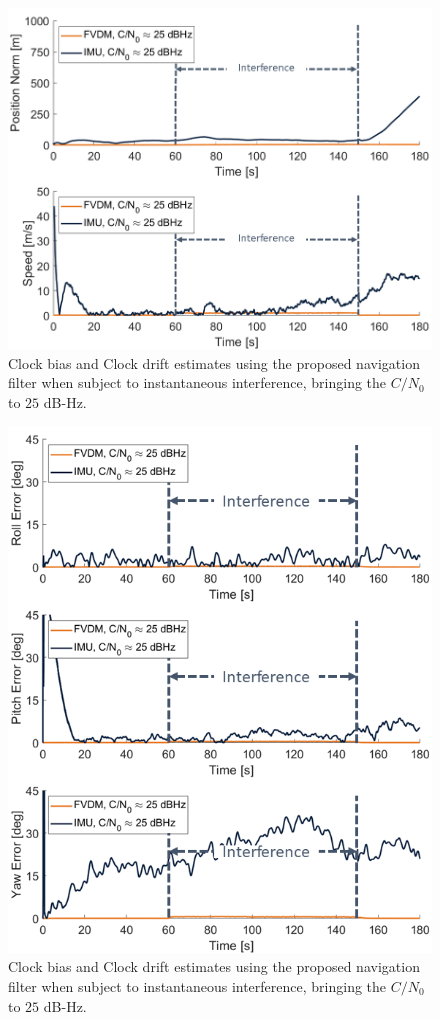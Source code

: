 \documentclass[12pt]{report}
\begin{document}
\begin{figure}[!ht]
  \centering
  \includegraphics[width=0.75\linewidth]{Figures/Results/trajectoryfigure/Slide16.PNG}
  \caption{Clock bias and Clock drift estimates using the proposed navigation filter when subject to instantaneous interference, bringing the \(C/N_0\) to \(25\) dB-Hz.}\label{fig:PosVel25}
\end{figure}


\begin{figure}[!ht]
  \centering
  \includegraphics[width=0.75\linewidth]{Figures/Results/trajectoryfigure/Slide4.PNG}
  \caption{Clock bias and Clock drift estimates using the proposed navigation filter when subject to instantaneous interference, bringing the \(C/N_0\) to \(25\) dB-Hz.}\label{fig:Eul25}
\end{figure}
\end{document}
